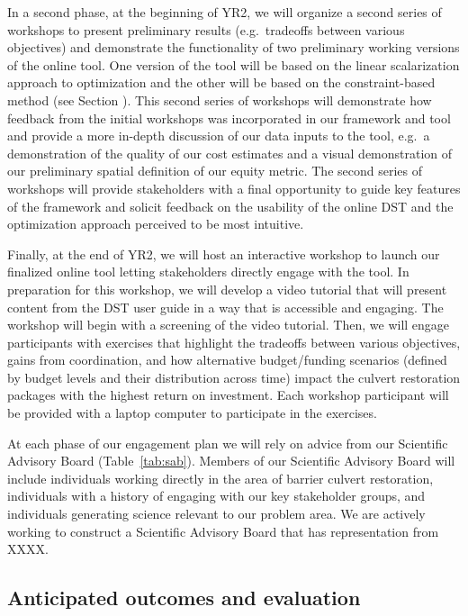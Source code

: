 \documentclass[12pt]{elsarticle}
\begin{document}
In a second phase, at the beginning of YR2, we will organize a second series of workshops to present preliminary results (e.g.\ tradeoffs between various objectives) and demonstrate the functionality of two preliminary working versions of the online tool. One version of the tool will be based on the linear scalarization approach to optimization and the other will be based on the constraint-based method (see Section \label{sec:opt}). This second series of workshops will demonstrate how feedback from the initial workshops was incorporated in our framework and tool and provide a more in-depth discussion of our data inputs to the tool, e.g.\ a demonstration of the quality of our cost estimates and a visual demonstration of our preliminary spatial definition of our equity metric. The second series of workshops will provide stakeholders with a final opportunity to guide key features of the framework and solicit feedback on the usability of the online DST and the optimization approach perceived to be most intuitive. 

Finally, at the end of YR2, we will host an interactive workshop to launch our finalized online tool letting stakeholders directly engage with the tool. In preparation for this workshop, we will develop a video tutorial that will present content from the DST user guide in a way that is accessible and engaging. The workshop will begin with a screening of the video tutorial. Then, we will engage participants with exercises that highlight the tradeoffs between various objectives, gains from coordination, and how alternative budget/funding scenarios (defined by budget levels and their distribution across time) impact the culvert restoration packages with the highest return on investment. Each workshop participant will be provided with a laptop computer to participate in the exercises. 

At each phase of our engagement plan we will rely on advice from our Scientific Advisory Board (Table~\ref{tab:sab}). Members of our Scientific Advisory Board will include individuals working directly in the area of barrier culvert restoration, individuals with a history of engaging with our key stakeholder groups, and individuals generating science relevant to our problem area. We are actively working to construct a Scientific Advisory Board that has representation from XXXX.

\subsection{Anticipated outcomes and evaluation}
\end{document}
